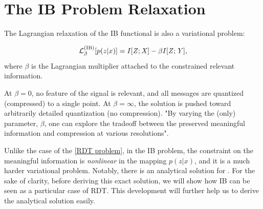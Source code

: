 
\section{The IB Problem Relaxation}\label{sec:ib_problem_relaxation}
The Lagrangian relaxation of the IB functional is also a variational problem:

\begin{align}
	\mathcal{L}_{\beta}^{\text{(IB)}}[p(z|x)] = I[{{\mathit{Z}}};{{\mathit{X}}}] - \beta I[{{\mathit{Z}}};{{\mathit{Y}}}], \label{IB_Lagrangian}
\end{align}
where $\beta$ is the Lagrangian multiplier attached to the constrained relevant information\cite{tishby:1999}.

At $\beta=0$, no feature of the signal is relevant, and all messages are quantized (compressed) to a single point. At $\beta=\infty$, the solution is pushed toward arbitrarily detailed quantization (no compression). "By varying the (only) parameter, $ \beta$, one can explore the tradeoff between the preserved meaningful information and compression at various resolutions"\cite{tishby:1999}.


Unlike the case of the \cref{RDT problem}, in the IB problem, the constraint on the meaningful information is \emph{nonlinear} in the mapping  $p(z|x)$, and it is a much harder variational problem. Notably, there is an analytical solution for . For the sake of clarity, before deriving this exact solution, we will show how IB can be seen as a particular case of \ac*{RDT}. This development will further help us to derive the analytical solution easily.

